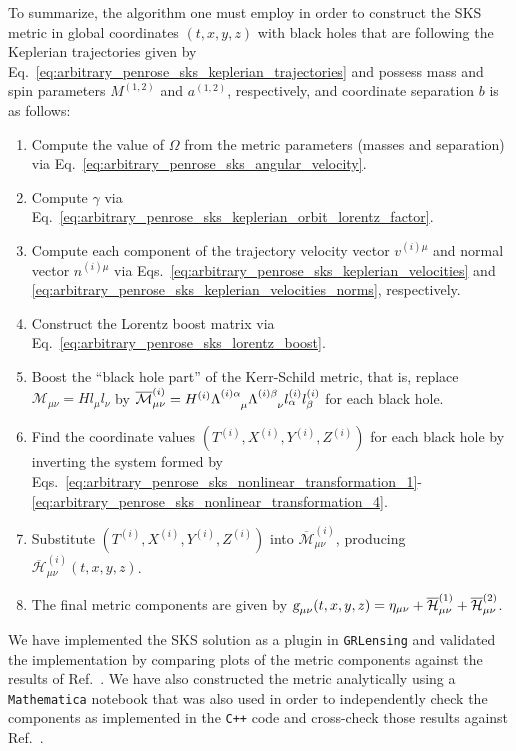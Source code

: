 To summarize, the algorithm one must employ in order to construct the \ac{SKS} metric in global coordinates $(t,x,y,z)$ with black holes that are following the Keplerian trajectories given by Eq.~\eqref{eq:arbitrary_penrose_sks_keplerian_trajectories} and possess mass and spin parameters $M^{(1,2)}$ and $a^{(1,2)}$, respectively, and coordinate separation $b$ is as follows:
%
\begin{enumerate}
  \item Compute the value of $\Omega$ from the metric parameters (masses and separation) via Eq.~\eqref{eq:arbitrary_penrose_sks_angular_velocity}.
  \item Compute $\gamma$ via Eq.~\eqref{eq:arbitrary_penrose_sks_keplerian_orbit_lorentz_factor}.
  \item Compute each component of the trajectory velocity vector $v^{(i) \mu}$ and normal vector $n^{(i) \mu}$ via Eqs.~\eqref{eq:arbitrary_penrose_sks_keplerian_velocities} and \eqref{eq:arbitrary_penrose_sks_keplerian_velocities_norms}, respectively.
  \item Construct the Lorentz boost matrix via Eq.~\eqref{eq:arbitrary_penrose_sks_lorentz_boost}.
  \item Boost the ``black hole part'' of the Kerr-Schild metric, that is, replace  $\mathcal{M}_{\mu\nu} = H l_\mu l_\nu$ by $\overline{\mathcal{M}}^{(i)}_{\mu\nu} = H^{(i)} \tens{\Lambda}{(i) \alpha}{\mu} \tens{\Lambda}{(i) \beta}{\nu} l^{(i)}_\alpha l^{(i)}_\beta$ for each black hole.
  \item Find the coordinate values $(T^{(i)}, X^{(i)}, Y^{(i)}, Z^{(i)})$ for each black hole by inverting the system formed by Eqs.~\eqref{eq:arbitrary_penrose_sks_nonlinear_transformation_1}-\eqref{eq:arbitrary_penrose_sks_nonlinear_transformation_4}.
  \item Substitute $(T^{(i)}, X^{(i)}, Y^{(i)}, Z^{(i)})$ into $\overline{\mathcal{M}}^{(i)}_{\mu\nu}$, producing $\overline{\mathcal{H}}^{(i)}_{\mu\nu}(t,x,y,z)$.
  \item The final metric components are given by $\mtrtens{\mu}{\nu}(t,x,y,z) = \eta_{\mu\nu} + \overline{\mathcal{H}}^{(1)}_{\mu\nu} + \overline{\mathcal{H}}^{(2)}_{\mu\nu}$.
\end{enumerate}

We have implemented the \ac{SKS} solution as a plugin in \texttt{GRLensing} and validated the implementation by comparing plots of the metric components against the results of Ref.~\cite{PhysRevD.104.044041}. We have also constructed the metric analytically using a \texttt{Mathematica} notebook that was also used in order to independently check the components as implemented in the \texttt{C++} code and cross-check those results against Ref.~\cite{PhysRevD.104.044041}.

